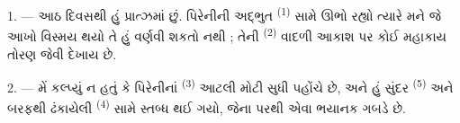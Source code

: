 %
%
%

\VUsaut{4.0mm}
\VUsaut{3.0mm}

\VUsaut{3.0mm}

\VUsaut{3.0mm}

1. --- આઠ દિવસથી હું પ્રાત્ઝમાં છું. પિરેનીની અદ્ભુત 
\textsuperscript{(1)} સામે ઊભો રહ્યો ત્યારે મને જે આખો વિસ્મય થયો તે હું
વર્ણવી શકતો નથી ; તેની  \textsuperscript{(2)} વાદળી આકાશ પર
કોઈ મહાકાય તોરણ જેવી દેખાય છે.

2. --- મેં કલ્પ્યું ન હતું કે પિરેનીનાં 
\textsuperscript{(3)} આટલી મોટી  સુધી પહોંચે છે, અને હું
સુંદર  \textsuperscript{(5)} અને બરફથી ઢંકાયેલી
 \textsuperscript{(4)} સામે સ્તબ્ધ થઈ ગયો, જેના
પરથી એવા ભયાનક  ગબડે છે.

